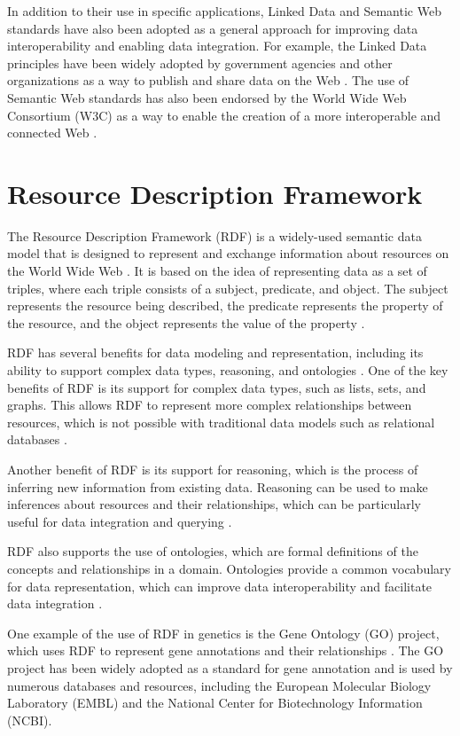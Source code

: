 In addition to their use in specific applications, Linked Data and Semantic Web standards have also been adopted as a general approach for improving data interoperability and enabling data integration.  For example, the Linked Data principles have been widely adopted by government agencies and other organizations as a way to publish and share data on the Web \citep*{bizer2011linkedData}.  The use of Semantic Web standards has also been endorsed by the World Wide Web Consortium (W3C) as a way to enable the creation of a more interoperable and connected Web \citep*{shadbolt2006semantic}.

\section{Resource Description Framework}
The Resource Description Framework (RDF) is a widely-used semantic data model that is designed to represent and exchange information about resources on the World Wide Web \citep*{schreiber2014rdf}.  It is based on the idea of representing data as a set of triples, where each triple consists of a subject, predicate, and object.  The subject represents the resource being described, the predicate represents the property of the resource, and the object represents the value of the property \citep*{schreiber2014rdf}.

RDF has several benefits for data modeling and representation, including its ability to support complex data types, reasoning, and ontologies \citep*{schreiber2014rdf}.  One of the key benefits of RDF is its support for complex data types, such as lists, sets, and graphs.  This allows RDF to represent more complex relationships between resources, which is not possible with traditional data models such as relational databases \citep*{allemang2011semantic}.

Another benefit of RDF is its support for reasoning, which is the process of inferring new information from existing data.  Reasoning can be used to make inferences about resources and their relationships, which can be particularly useful for data integration and querying \citep*{allemang2011semantic}.

RDF also supports the use of ontologies, which are formal definitions of the concepts and relationships in a domain.  Ontologies provide a common vocabulary for data representation, which can improve data interoperability and facilitate data integration \citep*{heath2011linked}.

One example of the use of RDF in genetics is the Gene Ontology (GO) project, which uses RDF to represent gene annotations and their relationships \citep*{gene2004gene}.  The GO project has been widely adopted as a standard for gene annotation and is used by numerous databases and resources, including the European Molecular Biology Laboratory (EMBL) and the National Center for Biotechnology Information (NCBI).

